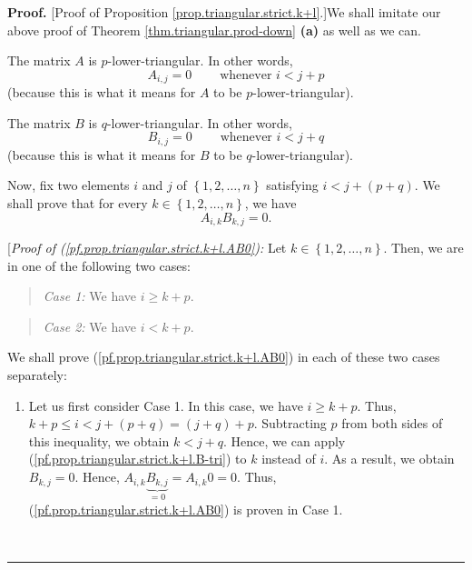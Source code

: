 \documentclass[numbers=enddot,12pt,final,onecolumn,notitlepage]{scrartcl}%
\theoremstyle{definition}
\newenvironment{statement}{\begin{quote}}{\end{quote}}
\newenvironment{proof}[1][Proof]{\noindent\textbf{#1.} }{\ \rule{0.5em}{0.5em}}
\begin{document}
\begin{proof}
[Proof of Proposition \ref{prop.triangular.strict.k+l}.]We shall imitate our
above proof of Theorem \ref{thm.triangular.prod-down} \textbf{(a)} as well as
we can.

The matrix $A$ is $p$-lower-triangular. In other words,%
\begin{equation}
A_{i,j}=0\ \ \ \ \ \ \ \ \ \ \text{whenever }i<j+p
\label{pf.prop.triangular.strict.k+l.A-tri}%
\end{equation}
(because this is what it means for $A$ to be $p$-lower-triangular).

The matrix $B$ is $q$-lower-triangular. In other words,%
\begin{equation}
B_{i,j}=0\ \ \ \ \ \ \ \ \ \ \text{whenever }i<j+q
\label{pf.prop.triangular.strict.k+l.B-tri}%
\end{equation}
(because this is what it means for $B$ to be $q$-lower-triangular).

Now, fix two elements $i$ and $j$ of $\left\{  1,2,\ldots,n\right\}  $
satisfying $i<j+\left(  p+q\right)  $. We shall prove that for every
$k\in\left\{  1,2,\ldots,n\right\}  $, we have
\begin{equation}
A_{i,k}B_{k,j}=0. \label{pf.prop.triangular.strict.k+l.AB0}%
\end{equation}


[\textit{Proof of (\ref{pf.prop.triangular.strict.k+l.AB0}):} Let
$k\in\left\{  1,2,\ldots,n\right\}  $. Then, we are in one of the following
two cases:

\begin{statement}
\textit{Case 1:} We have $i\geq k+p$.
\end{statement}

\begin{statement}
\textit{Case 2:} We have $i<k+p$.
\end{statement}

We shall prove (\ref{pf.prop.triangular.strict.k+l.AB0}) in each of these two
cases separately:

\begin{enumerate}
\item Let us first consider Case 1. In this case, we have $i\geq k+p$. Thus,
$k+p\leq i<j+\left(  p+q\right)  =\left(  j+q\right)  +p$. Subtracting $p$
from both sides of this inequality, we obtain $k<j+q$. Hence, we can apply
(\ref{pf.prop.triangular.strict.k+l.B-tri}) to $k$ instead of $i$. As a
result, we obtain $B_{k,j}=0$. Hence, $A_{i,k}\underbrace{B_{k,j}}%
_{=0}=A_{i,k}0=0$. Thus, (\ref{pf.prop.triangular.strict.k+l.AB0}) is proven
in Case 1.


\end{enumerate}
\end{proof}
\end{document}
